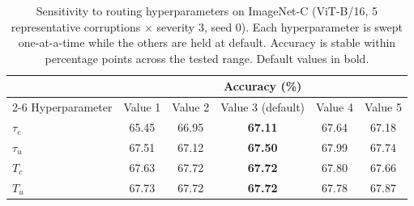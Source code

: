 \begin{table}[t]
\centering
\caption{Sensitivity to routing hyperparameters on ImageNet-C (ViT-B/16, 5 representative corruptions $\times$ severity 3, seed 0). Each hyperparameter is swept one-at-a-time while the others are held at default. Accuracy is stable within \sensRange{} percentage points across the tested range. Default values in bold.}
\label{tab:sensitivity}
\begin{tabular}{lccccc}
\toprule
 & \multicolumn{5}{c}{Accuracy (\%)} \\
\cmidrule(lr){2-6}
Hyperparameter & Value 1 & Value 2 & Value 3 (default) & Value 4 & Value 5 \\
\midrule
$\tau_c$ & 65.45 & 66.95 & \textbf{67.11} & 67.64 & 67.18 \\
$\tau_u$ & 67.51 & 67.12 & \textbf{67.50} & 67.99 & 67.74 \\
$T_c$    & 67.63 & 67.72 & \textbf{67.72} & 67.80 & 67.66 \\
$T_u$    & 67.73 & 67.72 & \textbf{67.72} & 67.78 & 67.87 \\
\bottomrule
\end{tabular}
\end{table}
